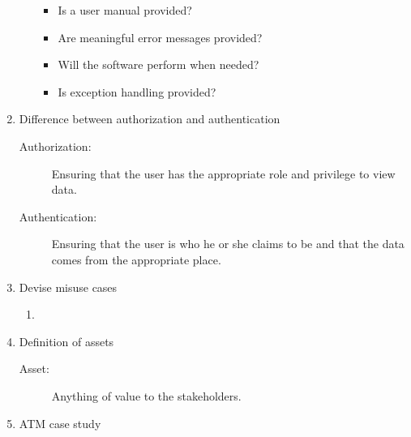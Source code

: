 \documentclass[a4paper]{article}
\begin{document}
\begin{enumerate}
\begin{itemize}
\begin{itemize}
						\item Is a user manual provided?
						\item Are meaningful error messages provided?
						\item Will the software perform when needed?
						\item Is exception handling provided?
					\end{itemize}
			\end{itemize}
		\item Difference between authorization and authentication
			\begin{description}
				\item[Authorization:] Ensuring that the user has the appropriate role
					and privilege to view data.
				\item[Authentication:] Ensuring that the user is who he or she claims
					to be and that the data comes from the appropriate place.
			\end{description}
		\item Devise misuse cases
			\begin{enumerate}
				\item 
			\end{enumerate}
		\item Definition of assets
			\begin{description}
				\item[Asset:] Anything of value to the stakeholders.
			\end{description}
		\item ATM case study
	\end{enumerate}
\end{document}
